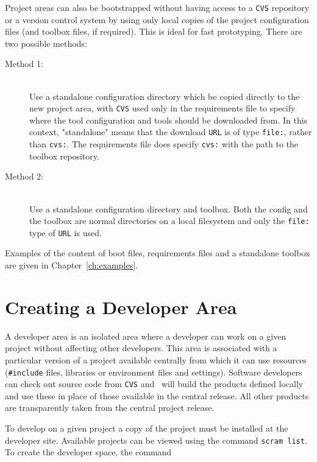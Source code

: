 Project areas can also be bootstrapped without having access to a
\texttt{CVS} repository or a version control system by using only local copies of the project
configuration files (and toolbox files, if required). This is ideal for fast prototyping.
There are two possible methods:

\begin{description}
\item[Method 1:]\mbox{}\\ 
Use a standalone configuration directory which be copied directly to
the new project area, with \texttt{CVS} used only in the requirements
file to specify where the tool configuration and tools should be
downloaded from.
In this context, "standalone" means that the download \texttt{URL} is
of type \texttt{file:}, rather than \texttt{cvs:}.
The requirements file does specify \texttt{cvs:} with the path to the
toolbox repository.

\item[Method 2:]\mbox{}\\ 
Use a standalone configuration directory and toolbox. Both the config
and the toolbox are normal directories on a local filesystem and only
the \texttt{file:} type of \texttt{URL} is used.
\end{description}

\ni Examples of the content of boot files, requirements files and a
standalone toolbox are given in Chapter~\ref{ch:examples}.

\section{Creating a Developer Area}\label{sec:SCRAMdevareas}

\ni A developer area is an isolated area where a developer can work on a
given project without affecting other developers. This area is
associated with a particular version of a project available centrally
from which it can use resources (\eg \texttt{\#include} files, libraries or
environment files and settings). Software developers can check out source code 
from \texttt{CVS} and \scram\ will build the products defined locally
and use these in place of those available in the
central release. All other products are transparently taken from the central project
release.

\ni To develop on a given project a copy of the project must be installed
at the developer site. Available projects can be viewed using the
command \texttt{scram list}. To create the developer space, the command

